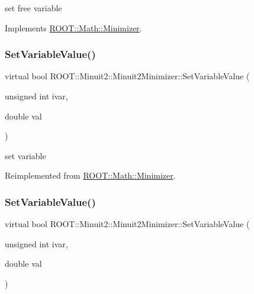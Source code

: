 set free variable 



Implements \mbox{\hyperlink{classROOT_1_1Math_1_1Minimizer_a8661a2ac86372602f32f97b3d9262421}{R\+O\+O\+T\+::\+Math\+::\+Minimizer}}.

\mbox{\label{classROOT_1_1Minuit2_1_1Minuit2Minimizer_a474e05b30c1227e9cc39fb597027f426}} 
\subsubsection{\texorpdfstring{SetVariableValue()}{SetVariableValue()}\hspace{0.1cm}{\footnotesize\ttfamily [1/2]}}
{\footnotesize\ttfamily virtual bool R\+O\+O\+T\+::\+Minuit2\+::\+Minuit2\+Minimizer\+::\+Set\+Variable\+Value (\begin{DoxyParamCaption}\item[{unsigned int}]{ivar,  }\item[{double}]{val }\end{DoxyParamCaption})\hspace{0.3cm}{\ttfamily [virtual]}}



set variable 



Reimplemented from \mbox{\hyperlink{classROOT_1_1Math_1_1Minimizer_a47e9a16c7a0b4ecfe769ee4be048d5c3}{R\+O\+O\+T\+::\+Math\+::\+Minimizer}}.

\mbox{\label{classROOT_1_1Minuit2_1_1Minuit2Minimizer_a474e05b30c1227e9cc39fb597027f426}} 
\subsubsection{\texorpdfstring{SetVariableValue()}{SetVariableValue()}\hspace{0.1cm}{\footnotesize\ttfamily [2/2]}}
{\footnotesize\ttfamily virtual bool R\+O\+O\+T\+::\+Minuit2\+::\+Minuit2\+Minimizer\+::\+Set\+Variable\+Value (\begin{DoxyParamCaption}\item[{unsigned int}]{ivar,  }\item[{double}]{val }\end{DoxyParamCaption})\hspace{0.3cm}{\ttfamily [virtual]}}



